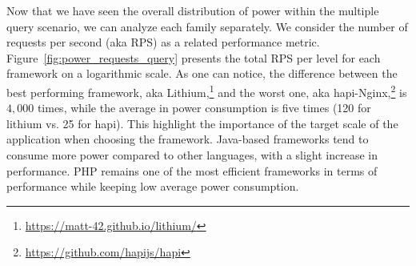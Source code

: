 \begin{table}[bth]
    \raggedright
    \caption{Average power consumption of frameworks based on the database type}
    \label{table:query_db_row}
\end{table}

Now that we have seen the overall distribution of power within the multiple query scenario, we can analyze each family separately.
We consider the number of requests per second (aka RPS) as a related performance metric.
Figure~\ref{fig:power_requests_query} presents the total RPS per level for each framework on a logarithmic scale.
As one can notice, the difference between the best performing framework, aka Lithium,\footnote{\url{https://matt-42.github.io/lithium/}} and the worst one, aka hapi-Nginx,\footnote{\url{https://github.com/hapijs/hapi}} is $4,000$ times, while the average in power consumption is five times (120 for lithium vs. 25 for hapi).
This highlight the importance of the target scale of the application when choosing the framework.
Java-based frameworks tend to consume more power compared to other languages, with a slight increase in performance.
PHP remains one of the most efficient frameworks in terms of performance while keeping low average power consumption.

